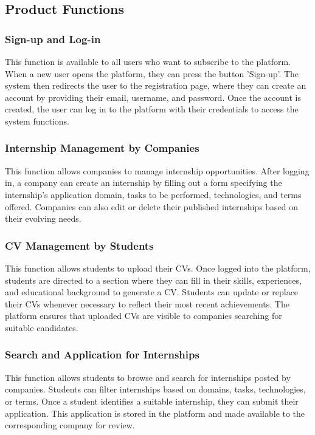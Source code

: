 \documentclass[12pt]{article}
\numberwithin{figure}{section}
\numberwithin{table}{section}
\begin{document}
\newpage

\subsection{Product Functions}

\subsubsection{Sign-up and Log-in}
This function is available to all users who want to subscribe to the platform. When a new user opens the platform, they can press the button 'Sign-up'. The system then redirects the user to the registration page, where they can create an account by providing their email, username, and password. Once the account is created, the user can log in to the platform with their credentials to access the system functions.

\subsubsection{Internship Management by Companies}
This function allows companies to manage internship opportunities. After logging in, a company can create an internship by filling out a form specifying the internship’s application domain, tasks to be performed, technologies, and terms offered. Companies can also edit or delete their published internships based on their evolving needs.

\subsubsection{CV Management by Students}
This function allows students to upload their CVs. Once logged into the platform, students are directed to a section where they can fill in their skills, experiences, and educational background to generate a CV. Students can update or replace their CVs whenever necessary to reflect their most recent achievements. The platform ensures that uploaded CVs are visible to companies searching for suitable candidates.

\subsubsection{Search and Application for Internships}
This function allows students to browse and search for internships posted by companies. Students can filter internships based on domains, tasks, technologies, or terms. Once a student identifies a suitable internship, they can submit their application. This application is stored in the platform and made available to the corresponding company for review.
\end{document}
